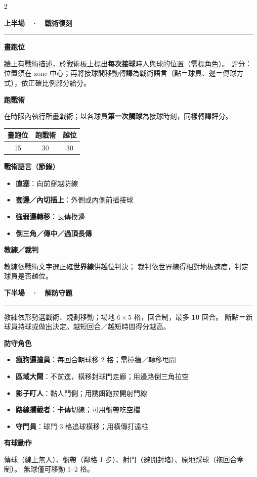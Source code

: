 \documentclass[12pt]{article}
\newcommand{\secHead}[1]{%
  \par\noindent\vspace{0.85em}%
  {\fontsize{26}{30}\selectfont\bfseries #1\par}%
  \noindent\rule{\linewidth}{1.2pt}\par
  \vspace{0.4em}%
  \noindent
}
\newcommand{\subHead}[1]{%
  \par\noindent\vspace{0.55em}%
  {\fontsize{18}{22}\selectfont\bfseries #1\par}%
  \vspace{0.25em}%
  \noindent
}
\begin{document}
\begin{multicols}{2}
\columnbreak

\secHead{上半場　·　戰術復刻}

\subHead{畫跑位}
牆上有戰術描述，於戰術板上標出\textbf{每次接球}時人與球的位置（需標角色）。
評分：位置須在 zone 中心；再將接球間移動轉譯為戰術語言（點＝球員、邊＝傳球方式），依正確比例部分給分。

\subHead{跑戰術}
在時限內執行所畫戰術；以各球員\textbf{第一次觸球}為接球時刻，同樣轉譯評分。

\vspace{0.4em}
\noindent
{\large
\begin{tabular}{|c|c|c|}
\hline
\textbf{畫跑位} & \textbf{跑戰術} & \textbf{越位} \\
\hline
15 & 30 & 30 \\
\hline
\end{tabular}}%
\hspace{0.5em}{\normalsize 單戰術滿分示意；6 戰術合計約 450 分}

\subHead{戰術語言（節錄）}
\begin{itemize}
  \item \textbf{直塞}：向前穿越防線
  \item \textbf{套邊／內切插上}：外側或內側前插接球
  \item \textbf{強弱邊轉移}：長傳換邊
  \item \textbf{倒三角／傳中／過頂長傳}
\end{itemize}

\subHead{教練／裁判}
教練依戰術文字選正確\textbf{世界線}供越位判決；
裁判依世界線得相對地板速度，判定球員是否越位。

\secHead{下半場　·　解防守題}

教練依形勢選戰術、規劃移動；場地 $6\times5$ 格，回合制，最多 \textbf{10} 回合。
斷點＝新球員持球或做出決定。越短回合／越短時間得分越高。

\subHead{防守角色}
\begin{itemize}
  \item \textbf{瘋狗逼搶員}：每回合朝球移 2 格；需撞牆／轉移甩開
  \item \textbf{區域大閘}：不前進，橫移封球門走廊；用邊路倒三角拉空
  \item \textbf{影子盯人}：黏人門側；用誘餌跑拉開射門線
  \item \textbf{路線攔截者}：卡傳切線；可用盤帶吃空檔
  \item \textbf{守門員}：球門 3 格追球橫移；用橫傳打遠柱
\end{itemize}

\subHead{有球動作}
傳球（線上無人）、盤帶（鄰格 1 步）、射門（避開封堵）、原地踩球（拖回合牽制）。
無球僅可移動 1–2 格。


\end{multicols}
\end{document}
